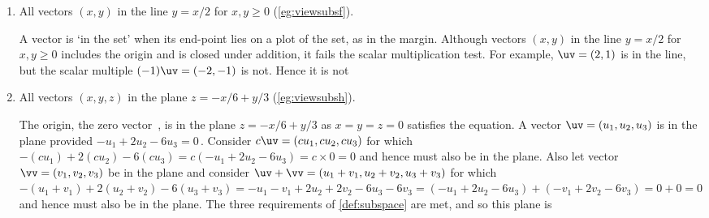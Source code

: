 \begin{example}
\begin{enumerate}[ref=\ref{eg:somsubs}(\alph*)]
\item All vectors \((x,y)\) in the line \(y=x/2\) for \(x,y\geq0\) (\cref{eg:viewsubsf}).
\begin{solution} 
A vector is `in the set' when its end-point lies on a plot of the set, as in the margin.
%
Although vectors \((x,y)\) in the line \(y=x/2\) for \(x,y\geq0\) includes the origin and is closed under addition, it fails the scalar multiplication test.
For example, \(\uv=(2,1)\) is in the line, but the scalar multiple \((-1)\uv=(-2,-1)\) is not.
Hence it is not 
\end{solution}


\item All vectors \((x,y,z)\) in the plane \(z=-x/6+y/3\) (\cref{eg:viewsubsh}).
\begin{center}
\end{center}
\begin{solution} 
The origin, the zero vector~\ov, is in the plane \(z=-x/6+y/3\) as \(x=y=z=0\) satisfies the equation.
A vector \(\uv=(u_1,u_2,u_3)\) is in the plane provided \(-u_1+2u_2-6u_3=0\)\,.
Consider \(c\uv=(cu_1,cu_2,cu_3)\) for which \(-(cu_1)+2(cu_2)-6(cu_3) =c(-u_1+2u_2-6u_3) =c\times0=0\) and hence must also be in the plane.
Also let vector \(\vv=(v_1,v_2,v_3)\) be in the plane and consider \(\uv+\vv=(u_1+v_1,u_2+v_2,u_3+v_3)\) for which \(-(u_1+v_1)+2(u_2+v_2)-6(u_3+v_3) =-u_1-v_1+2u_2+2v_2-6u_3-6v_3 =(-u_1+2u_2-6u_3) +(-v_1+2v_2-6v_3) =0+0 =0\) and hence must also be in the plane.
The three requirements of \cref{def:subspace} are met, and so this plane is 
\end{solution}



\end{enumerate}
\end{example}
